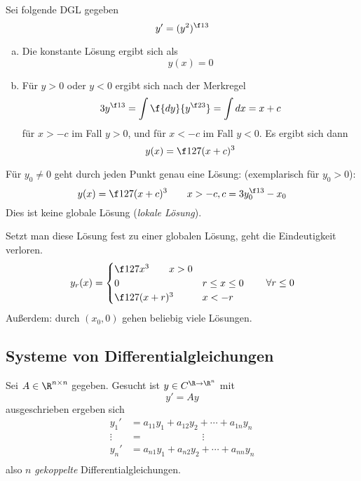\documentclass[a4paper,10pt]{scrbook}
\begin{document}
\begin{ex} \label{2.3}
	Sei folgende DGL gegeben
	\[
		y' = (y^2)^{\f 13}
	\]
	\begin{enumerate}[a)]
		\item
			Die konstante Lösung ergibt sich als
			\[
				y(x) = 0
			\]
		\item
			Für $y > 0$ oder $y < 0$ ergibt sich nach der Merkregel
			\[
				3 y^{\f 13} = \int \f {dy}{y^{\f 23}} = \int  dx = x + c 
			\]
			für $x > -c$ im Fall $y > 0$, und für $x < -c$ im Fall $y < 0$.
			Es ergibt sich dann
			\[
				y(x) = \f 1{27}(x + c)^3
			\]
	\end{enumerate}
	\begin{note}[Beobachtungen]
		Für $y_0 \neq 0$ geht durch jeden Punkt genau eine Lösung:
		(exemplarisch für $y_0 > 0$):
		\[
			y(x) = \f 1{27}(x+c)^3  
			\qquad x > -c, c = 3y_0^{\f 13} - x_0
		\]
		Dies ist keine globale Lösung (\emph{lokale Lösung}).

		Setzt man diese Lösung fest zu einer globalen Lösung, geht die Eindeutigkeit verloren.
		\[
			y_r(x) = \begin{cases}
				\f 1{27} x^3 \qquad x > 0 \\
				0 & r \le x \le 0 \\
				\f 1{27} (x+r)^3 & x < -r
			\end{cases}
			\qquad \forall r \le 0
		\]
		Außerdem: durch $(x_0, 0)$ gehen beliebig viele Lösungen.
	\end{note}
\end{ex}


\subsection{Systeme von Differentialgleichungen}


Sei $A \in \R^{n\times n}$ gegeben.
Gesucht ist $y \in C^{\R \to \R^n}$ mit
\[
	y' = Ay
\]
ausgeschrieben ergeben sich
\begin{align*}
	y_1' &= a_{11} y_1 + a_{12} y_2 + \dotsb + a_{1n} y_n \\
	\vdots \; &= \qquad\qquad\qquad \vdots \\
	y_n' &= a_{n1} y_1 + a_{n2} y_2 + \dotsb + a_{nn} y_n \\
\end{align*}
also $n$ \emph{gekoppelte} Differentialgleichungen.
\end{document}
